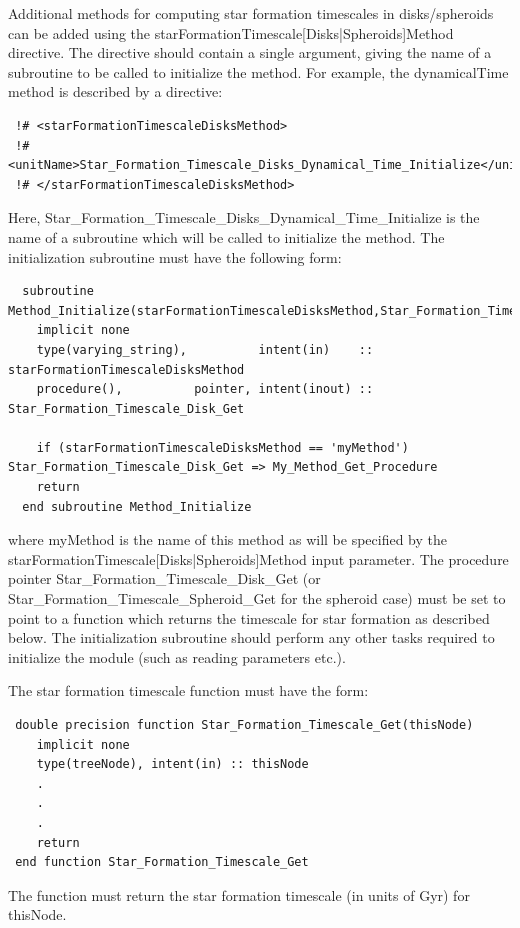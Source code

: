 Additional methods for computing star formation timescales in disks/spheroids can be added using the {\normalfont \ttfamily starFormationTimescale[Disks|Spheroids]Method} directive. The directive should contain a single argument, giving the name of a subroutine to be called to initialize the method. For example, the {\normalfont \ttfamily dynamicalTime} method is described by a directive:
\begin{verbatim}
 !# <starFormationTimescaleDisksMethod>
 !#  <unitName>Star_Formation_Timescale_Disks_Dynamical_Time_Initialize</unitName>
 !# </starFormationTimescaleDisksMethod>
\end{verbatim}
Here, {\normalfont \ttfamily Star\_Formation\_Timescale\_Disks\_Dynamical\_Time\_Initialize} is the name of a subroutine which will be called to initialize the method. The initialization subroutine must have the following form:
\begin{verbatim}
  subroutine Method_Initialize(starFormationTimescaleDisksMethod,Star_Formation_Timescale_Disk_Get)
    implicit none
    type(varying_string),          intent(in)    :: starFormationTimescaleDisksMethod
    procedure(),          pointer, intent(inout) :: Star_Formation_Timescale_Disk_Get
    
    if (starFormationTimescaleDisksMethod == 'myMethod') Star_Formation_Timescale_Disk_Get => My_Method_Get_Procedure
    return
  end subroutine Method_Initialize
\end{verbatim}
where {\normalfont \ttfamily myMethod} is the name of this method as will be specified by the {\normalfont \ttfamily starFormationTimescale[Disks|Spheroids]Method} input parameter. The procedure pointer {\normalfont \ttfamily Star\_Formation\_Timescale\_Disk\_Get} (or {\normalfont \ttfamily Star\_Formation\_Timescale\_Spheroid\_Get} for the spheroid case) must be set to point to a function which returns the timescale for star formation as described below. The initialization subroutine should perform any other tasks required to initialize the module (such as reading parameters etc.).

The star formation timescale function must have the form:
\begin{verbatim}
 double precision function Star_Formation_Timescale_Get(thisNode)
    implicit none
    type(treeNode), intent(in) :: thisNode
    .
    .
    .
    return
 end function Star_Formation_Timescale_Get
\end{verbatim}
The function must return the star formation timescale (in units of Gyr) for {\normalfont \ttfamily thisNode}.

